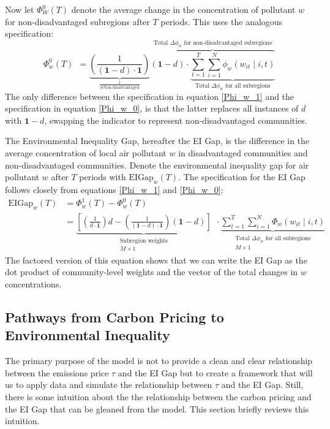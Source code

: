 Now let $\Phi_W^0(T)$ denote the average change in the concentration of pollutant $w$ for non-disadvantaged subregions after $T$ periods. This uses the analogous specification:
\begin{equation} \label{Phi_w_0}
    \Phi_w^0(T) ~~ = \underbrace{\left(\frac{1}{(\textbf{1} - d) \cdot \textbf{1}}\right)}_{\frac{1}{\text{\# Non-disadvantaged}}} \overbrace{\left(\textbf{1} - d\right) \cdot \underbrace{\sum_{t = 1}^T \sum_{i=1}^N \phi_w(w_{it}\mid i, t)}_{\text{Total $\Delta \phi_w$ for all subregions}} }^\text{Total $\Delta \phi_w$ for non-disadvantaged subregions}
\end{equation}
The only difference between the specification in equation \eqref{Phi_w_1} and the specification in equation \eqref{Phi_w_0}, is that the latter replaces all instances of $d$ with $\textbf{1} - d$, swapping the indicator to represent non-disadvantaged communities. 

The Environmental Inequality Gap, hereafter the EI Gap, is the difference in the average concentration of local air pollutant $w$ in disadvantaged communities and non-disadvantaged communities. Denote the environmental inequality gap for air pollutant $w$ after $T$ periods with $\text{EIGap}_w(T)$. The specification for the EI Gap follows closely from equations \eqref{Phi_w_1} and \eqref{Phi_w_0}:
\begin{align}
    \text{EIGap}_w(T) &= \Phi_w^1(T) - \Phi_w^0(T) \\
        &= \underbrace{\left[
            \left(\frac{1}{d \cdot \textbf{1}}\right) d - \left(\frac{1}{(\textbf{1} - d) \cdot \textbf{1}}\right) \left(\textbf{1} - d\right)
        \right]}_{\substack{\text{Subregion weights}\\ M\times 1 }} ~~ \cdot \underbrace{\sum_{t = 1}^T \sum_{i=1}^N \Phi_w(w_{it}\mid i, t)}_{\substack{\text{Total $\Delta \phi_w$ for all subregions}\\ M \times 1}}
\end{align}
The factored version of this equation shows that we can write the EI Gap as the dot product of community-level weights and the vector of the total changes in $w$ concentrations. 


\subsection{Pathways from Carbon Pricing to Environmental Inequality}

The primary purpose of the model is not to provide a clean and clear relationship between the emissions price $\tau$ and the EI Gap but to create a framework that will us to apply data and simulate the relationship between $\tau$ and the EI Gap. Still, there is some intuition about the the relationship between the carbon pricing and the EI Gap that can be gleaned from the model. This section briefly reviews this intuition. 

